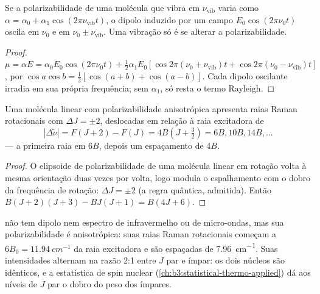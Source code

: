 \begin{proposition}\label{prop:b3:rovibrational-spectroscopy:raman-classical}
Se a polarizabilidade de uma molécula que vibra em $\nu_{\mathrm{vib}}$ varia
como $\alpha = \alpha_0 + \alpha_1\cos(2\pi\nu_{\mathrm{vib}}t)$, o dipolo induzido por um
campo $E_0\cos(2\pi\nu_0t)$ oscila em $\nu_0$ e em $\nu_0 \pm \nu_{\mathrm{vib}}$.
Uma vibração só é  se alterar a polarizabilidade.
\end{proposition}

\begin{proof}
$\mu = \alpha E = \alpha_0E_0\cos(2\pi\nu_0t) + \frac12\alpha_1E_0[\cos2\pi(\nu_0 +
\nu_{\mathrm{vib}})t + \cos2\pi(\nu_0 - \nu_{\mathrm{vib}})t]$, por $\cos a\cos b =
\frac12[\cos(a+b) + \cos(a-b)]$. Cada dipolo oscilante irradia em sua própria
frequência; sem $\alpha_1$, só resta o termo Rayleigh.
\end{proof}

\begin{proposition}\label{prop:b3:rovibrational-spectroscopy:rotational-raman}
Uma molécula linear com polarizabilidade anisotrópica apresenta raias Raman
rotacionais com $\Delta J = \pm2$, deslocadas em relação à raia excitadora de
\[
|\Delta\tilde\nu| = F(J+2) - F(J) = 4B(J + \tfrac32) = 6B, 10B, 14B, \dots
\]
--- a primeira raia em $6B$, depois um espaçamento de $4B$.
\end{proposition}

\begin{proof}
O elipsoide de polarizabilidade de uma molécula linear em rotação volta à
mesma orientação duas vezes por volta, logo modula o espalhamento com o dobro
da frequência de rotação: $\Delta J = \pm2$ (a regra quântica, admitida). Então
$B(J+2)(J+3) - BJ(J+1) = B(4J + 6)$.
\end{proof}

\begin{example}\label{ex:b3:rovibrational-spectroscopy:n2}
 não tem dipolo nem espectro de infravermelho ou de micro-ondas, mas sua
polarizabilidade é anisotrópica: suas raias Raman rotacionais começam a $6B_0 =
\qty{11.94}{cm^{-1}}$ da raia excitadora e são espaçadas de \qty{7.96}{cm^{-1}}. Suas
intensidades alternam na razão 2:1 entre $J$ par e ímpar: os dois núcleos  são
idênticos, e a estatística de spin nuclear (\cref{ch:b3:statistical-thermo-applied})
dá aos níveis de $J$ par o dobro do peso dos ímpares.
\end{example}

